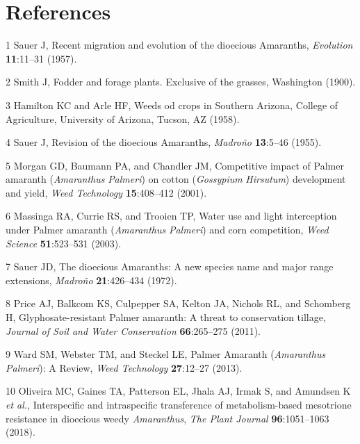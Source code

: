 \documentclass[
  12pt,
  a4paper]{article}
\begin{document}
\hypertarget{references}{%
\section*{References}\label{references}}

\hypertarget{refs}{}
\leavevmode\hypertarget{ref-sauer_recent_1957}{}%
1 Sauer J, Recent migration and evolution of the dioecious Amaranths,
\emph{Evolution} \textbf{11}:11--31 (1957).

\leavevmode\hypertarget{ref-smith_fodder_1900}{}%
2 Smith J, Fodder and forage plants. Exclusive of the grasses,
Washington (1900).

\leavevmode\hypertarget{ref-hamilton_weeds_1958}{}%
3 Hamilton KC and Arle HF, Weeds od crops in Southern Arizona, College
of Agriculture, University of Arizona, Tucson, AZ (1958).

\leavevmode\hypertarget{ref-sauer_revision_1955}{}%
4 Sauer J, Revision of the dioecious Amaranths, \emph{Madroño}
\textbf{13}:5--46 (1955).

\leavevmode\hypertarget{ref-morgan_competitive_2001}{}%
5 Morgan GD, Baumann PA, and Chandler JM, Competitive impact of Palmer
amaranth (\emph{Amaranthus} \emph{Palmeri}) on cotton (\emph{Gossypium}
\emph{Hirsutum}) development and yield, \emph{Weed Technology}
\textbf{15}:408--412 (2001).

\leavevmode\hypertarget{ref-massinga_water_2003}{}%
6 Massinga RA, Currie RS, and Trooien TP, Water use and light
interception under Palmer amaranth (\emph{Amaranthus} \emph{Palmeri})
and corn competition, \emph{Weed Science} \textbf{51}:523--531 (2003).

\leavevmode\hypertarget{ref-sauer_dioecious_1972}{}%
7 Sauer JD, The dioecious Amaranths: A new species name and major range
extensions, \emph{Madroño} \textbf{21}:426--434 (1972).

\leavevmode\hypertarget{ref-price_glyphosate-resistant_2011}{}%
8 Price AJ, Balkcom KS, Culpepper SA, Kelton JA, Nichols RL, and
Schomberg H, Glyphosate-resistant Palmer amaranth: A threat to
conservation tillage, \emph{Journal of Soil and Water Conservation}
\textbf{66}:265--275 (2011).

\leavevmode\hypertarget{ref-ward_palmer_2013}{}%
9 Ward SM, Webster TM, and Steckel LE, Palmer Amaranth
(\emph{Amaranthus} \emph{Palmeri}): A Review, \emph{Weed Technology}
\textbf{27}:12--27 (2013).

\leavevmode\hypertarget{ref-oliveira_interspecific_2018}{}%
10 Oliveira MC, Gaines TA, Patterson EL, Jhala AJ, Irmak S, and Amundsen
K \emph{et al.}, Interspecific and intraspecific transference of
metabolism-based mesotrione resistance in dioecious weedy
\emph{Amaranthus}, \emph{The Plant Journal} \textbf{96}:1051--1063
(2018).
\end{document}

